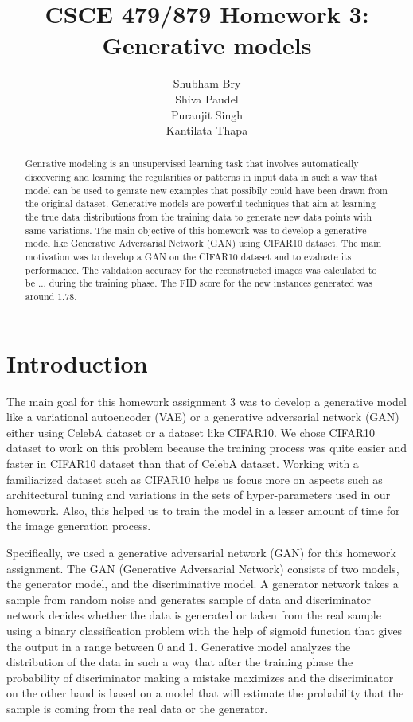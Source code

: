 \documentclass{article}
\title{CSCE 479/879 Homework 3: Generative models}
\author{Shubham Bry \\
Shiva Paudel \\
Puranjit Singh \\
Kantilata Thapa}
\begin{document}
\maketitle

\begin{abstract} 

Genrative modeling is an unsupervised learning task that involves automatically discovering and learning the regularities or patterns in input data in such a way that model can be used to genrate new examples that possibily could have been drawn from the original dataset. Generative models are powerful techniques that aim at learning the true data distributions from the training data to generate new data points with same variations. The main objective of this homework was to develop a generative model like Generative Adversarial Network (GAN) using CIFAR10 dataset. The main motivation was to develop a GAN on the CIFAR10 dataset and to evaluate its performance. The validation accuracy for the reconstructed images was calculated to be ... during the training phase. The FID score for the new instances generated was around 1.78.

\end{abstract}

\section{Introduction}
\label{sec:intro}

The main goal for this homework assignment 3 was to develop a generative model like a variational autoencoder (VAE) or a generative adversarial network (GAN) either using CelebA dataset or a dataset like CIFAR10. We chose CIFAR10 dataset to work on this problem because the training process was quite easier and faster in CIFAR10 dataset than that of CelebA dataset. Working with a familiarized dataset such as CIFAR10 helps us focus more on aspects such as architectural tuning and variations in the sets of hyper-parameters used in our homework. Also, this helped us to train the model in a lesser amount of time for the image generation process. 

Specifically, we used a generative adversarial network (GAN) for this homework assignment. The GAN (Generative Adversarial Network) consists of two models, the generator model, and the discriminative model. A generator network takes a sample from random noise and generates sample of data and discriminator network decides whether the data is generated or taken from the real sample using a binary classification problem with the help of sigmoid function that gives the output in a range between 0 and 1. Generative model analyzes the distribution of the data in such a way that after the training phase the probability of discriminator making a mistake maximizes and the discriminator on the other hand is based on a model that will estimate the probability that the sample is coming from the real data or the generator.  
\end{document}
